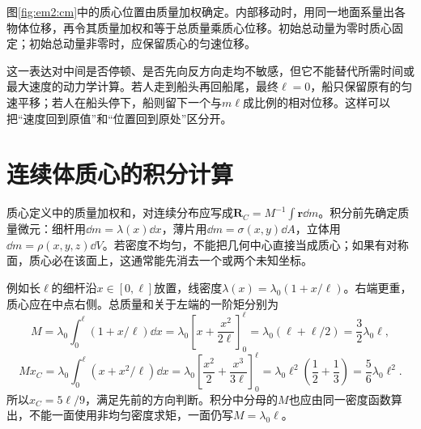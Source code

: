 
图\ref{fig:em2:cm}中的质心位置由质量加权确定。内部移动时，用同一地面系量出各物体位移，再令其质量加权和等于总质量乘质心位移。初始总动量为零时质心固定；初始总动量非零时，应保留质心的匀速位移。


这一表达对中间是否停顿、是否先向反方向走均不敏感，但它不能替代所需时间或最大速度的动力学计算。若人走到船头再回船尾，最终$\ell=0$，船只保留原有的匀速平移；若人在船头停下，船则留下一个与$m\ell$成比例的相对位移。这样可以把“速度回到原值”和“位置回到原处”区分开。

\section{连续体质心的积分计算}

质心定义中的质量加权和，对连续分布应写成$\bm R_C=M^{-1}\int\bm r\dd m$。积分前先确定质量微元：细杆用$\dd m=\lambda(x)\dd x$，薄片用$\dd m=\sigma(x,y)\dd A$，立体用$\dd m=\rho(x,y,z)\dd V$。若密度不均匀，不能把几何中心直接当成质心；如果有对称面，质心必在该面上，这通常能先消去一个或两个未知坐标。

例如长$\ell$的细杆沿$x\in[0,\ell]$放置，线密度$\lambda(x)=\lambda_0(1+x/\ell)$。右端更重，质心应在中点右侧。总质量和关于左端的一阶矩分别为
\[
M=\lambda_0\int_0^\ell(1+x/\ell)\dd x
=\lambda_0\left[x+\frac{x^2}{2\ell}\right]_0^\ell
=\lambda_0(\ell+\ell/2)=\frac32\lambda_0\ell,
\]
\[
Mx_C=\lambda_0\int_0^\ell(x+x^2/\ell)\dd x
=\lambda_0\left[\frac{x^2}{2}+\frac{x^3}{3\ell}\right]_0^\ell
=\lambda_0\ell^2\left(\frac12+\frac13\right)=\frac56\lambda_0\ell^2.
\]
所以$x_C=5\ell/9$，满足先前的方向判断。积分中分母的$M$也应由同一密度函数算出，不能一面使用非均匀密度求矩，一面仍写$M=\lambda_0\ell$。

